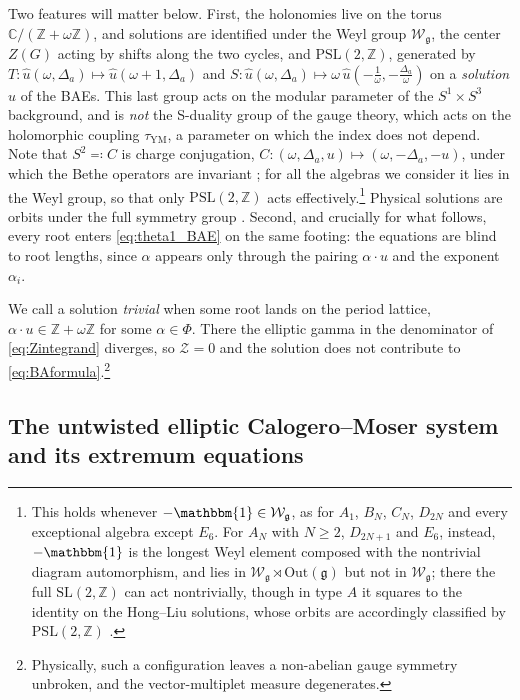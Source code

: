 \documentclass[aps, prx, nofootinbib, twocolumn,amsfonts,amsmath,amssymb,mathtools,superscriptaddress,preprintnumbers,floatfix,reprint]{revtex4-2}
\newcommand{\alg}{\mathfrak{g}}
\begin{document}
Two features will matter below. First, the holonomies live on the torus
$\mathbb{C}/(\mathbb{Z}+\omega\mathbb{Z})$, and solutions are identified under
the Weyl group $\mathcal{W}_\alg$, the center $Z(G)$ acting by shifts along the
two cycles, and $\mathrm{PSL}(2,\mathbb{Z})$, generated by
$T:\hat u(\omega,\Delta_a)\mapsto\hat u(\omega+1,\Delta_a)$ and
$S:\hat u(\omega,\Delta_a)\mapsto
    \omega\,\hat u\!\left(-\tfrac1\omega,-\tfrac{\Delta_a}{\omega}\right)$ on a \emph{solution} $\hat u$ of the BAEs. This 
last group acts on the modular parameter of the $S^1\times S^3$ background, and is
\emph{not} the S-duality group of the gauge theory, which acts on the holomorphic
coupling $\tau_{\mathrm{YM}}$, a parameter on which the index does not depend.
Note that $S^2\eqqcolon C$ is charge conjugation,
$C:(\omega,\Delta_a,u)\mapsto(\omega,-\Delta_a,-u)$, under which the Bethe
operators are invariant \cite[Eq.~(3.7)]{Benini:2018mlo}; for all the algebras
we consider it lies in the Weyl group, so that only $\mathrm{PSL}(2,\mathbb{Z})$
acts effectively.\footnote{This holds whenever
$-\mathbbm{1}\in\mathcal{W}_\alg$, as for $A_1$, $B_N$, $C_N$, $D_{2N}$ and
every exceptional algebra except $E_6$. For $A_N$ with $N\geq2$, $D_{2N+1}$ and
$E_6$, instead, $-\mathbbm{1}$ is the longest Weyl element composed with the
nontrivial diagram automorphism, and lies in
$\mathcal{W}_\alg\rtimes\mathrm{Out}(\alg)$ but not in $\mathcal{W}_\alg$;
there the full $\mathrm{SL}(2,\mathbb{Z})$ can act nontrivially, though in type
$A$ it squares to the identity on the Hong--Liu solutions, whose orbits are
accordingly classified by $\mathrm{PSL}(2,\mathbb{Z})$
\cite[Sec. 2]{Benini:2021ano}.} Physical solutions are orbits under the full symmetry group
\cite{B2paper}. Second, and crucially for what follows, every root enters
\eqref{eq:theta1_BAE} on the same footing: the equations are blind to root
lengths, since $\alpha$ appears only through the pairing $\alpha\cdot u$ and the
exponent $\alpha_i$.

We call a solution \emph{trivial} when some root lands on the period lattice,
$\alpha\cdot u\in\mathbb{Z}+\omega\mathbb{Z}$ for some $\alpha\in\Phi$. There the
elliptic gamma in the denominator of \eqref{eq:Zintegrand} diverges, so
$\mathcal{Z}=0$ and the solution does not contribute to
\eqref{eq:BAformula}.\footnote{Physically, such a configuration leaves a
non-abelian gauge symmetry unbroken, and the vector-multiplet measure
degenerates.}

\subsection{The untwisted elliptic Calogero--Moser system and its extremum
equations}
\label{sub:CM}
\end{document}
